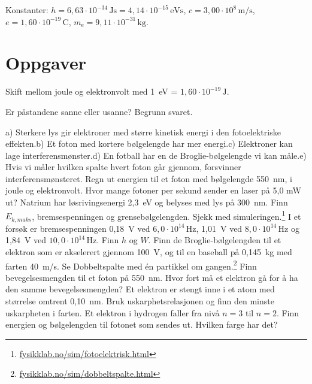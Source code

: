 \documentclass[11pt]{article}
\begin{document}
Konstanter: $h = 6{,}63 \cdot 10^{-34}\,\mathrm{Js} = 4{,}14 \cdot 10^{-15}\,\mathrm{eVs}$, $c = 3{,}00 \cdot 10^{8}\,\mathrm{m/s}$, $e = 1{,}60 \cdot 10^{-19}\,\mathrm{C}$, $m_{\mathrm{e}} = 9{,}11 \cdot 10^{-31}\,\mathrm{kg}$.

\section*{Oppgaver}

Skift mellom joule og elektronvolt med 1~eV = $1{,}60 \cdot 10^{-19}\,\mathrm{J}$.

\begin{oppgaveliste}
\oppgave {}Er påstandene sanne eller usanne? Begrunn svaret.

a) Sterkere lys gir elektroner med større kinetisk energi i den fotoelektriske effekten.\newline b) Et foton med kortere bølgelengde har mer energi.\newline c) Elektroner kan lage interferensmønster.\newline d) En fotball har en de Broglie-bølgelengde vi kan måle.\newline e) Hvis vi måler hvilken spalte hvert foton går gjennom, forsvinner interferensmønsteret.
\svar
\oppgave {}Regn ut energien til et foton med bølgelengde 550~nm, i joule og elektronvolt. Hvor mange fotoner per sekund sender en laser på 5,0 mW ut?
\svar
\oppgave {}Natrium har løsrivingsenergi 2,3~eV og belyses med lys på 300~nm. Finn $E_{k,maks}$, bremsespenningen og grensebølgelengden. Sjekk med simuleringen.\footnote{\url{fysikklab.no/sim/fotoelektrisk.html}}
\svar
\oppgave {}I et forsøk er bremsespenningen 0,18~V ved $6{,}0 \cdot 10^{14}\,\mathrm{Hz}$, 1,01~V ved $8{,}0 \cdot 10^{14}\,\mathrm{Hz}$ og 1,84~V ved $10{,}0 \cdot 10^{14}\,\mathrm{Hz}$. Finn $h$ og $W$.
\svar
\oppgave {}Finn de Broglie-bølgelengden til et elektron som er akselerert gjennom 100~V, og til en baseball på 0,145~kg med farten 40~m/s. Se Dobbeltspalte med én partikkel om gangen.\footnote{\url{fysikklab.no/sim/dobbeltspalte.html}}
\svar
\oppgave {}Finn bevegelsesmengden til et foton på 550~nm. Hvor fort må et elektron gå for å ha den samme bevegelsesmengden?
\svar
\oppgave {}Et elektron er stengt inne i et atom med størrelse omtrent 0,10~nm. Bruk uskarphetsrelasjonen og finn den minste uskarpheten i farten.
\svar
\oppgave {}Et elektron i hydrogen faller fra nivå $n = 3$ til $n = 2$. Finn energien og bølgelengden til fotonet som sendes ut. Hvilken farge har det?
\svar
\end{oppgaveliste}
\end{document}
